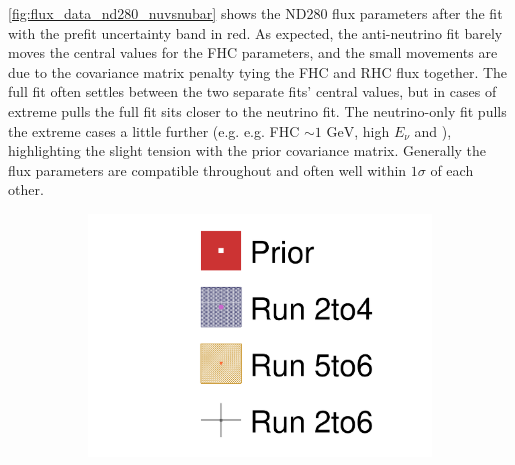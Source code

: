 \autoref{fig:flux_data_nd280_nuvsnubar} shows the ND280 flux parameters after the fit with the prefit uncertainty band in red. As expected, the anti-neutrino fit barely moves the central values for the FHC parameters, and the small movements are due to the covariance matrix penalty tying the FHC and RHC flux together. The full fit often settles between the two separate fits' central values, but in cases of extreme pulls the full fit sits closer to the neutrino fit. The neutrino-only fit pulls the extreme cases a little further (e.g. e.g. FHC \numu $\sim1\text{ GeV}$, high $E_\nu$ \numu and \numubar), highlighting the slight tension with the prior covariance matrix. Generally the flux parameters are compatible throughout and often well within $1\sigma$ of each other.
\begin{figure}[h]
	\begin{subfigure}[t]{0.10\textwidth}
		\includegraphics[width=\textwidth, trim={0mm 0mm 0mm 0mm}, clip,page=1]{figures/mach3/data/alt/2017b_Run2to4_Data_merge_2017b_Run56_Data_merge_2017b_NewData_NewDet_UpdXsecStep_2Xsec_4Det_5Flux_0}
	\end{subfigure}
	

\end{figure}

